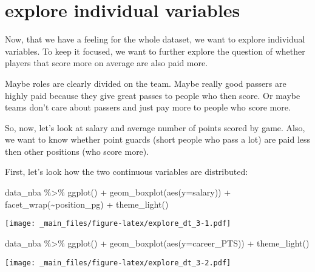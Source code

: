 \documentclass[
]{book}
\newenvironment{Shaded}{\begin{snugshade}}{\end{snugshade}}
\newcommand{\AttributeTok}[1]{\textcolor[rgb]{0.77,0.63,0.00}{#1}}
\newcommand{\AttributeTok}[1]{\textcolor[rgb]{0.13,0.29,0.53}{#1}}
\newcommand{\FunctionTok}[1]{\textcolor[rgb]{0.00,0.00,0.00}{#1}}
\newcommand{\FunctionTok}[1]{\textcolor[rgb]{0.13,0.29,0.53}{\textbf{#1}}}
\newcommand{\NormalTok}[1]{#1}
\newcommand{\SpecialCharTok}[1]{\textcolor[rgb]{0.00,0.00,0.00}{#1}}
\newcommand{\SpecialCharTok}[1]{\textcolor[rgb]{0.81,0.36,0.00}{\textbf{#1}}}
\begin{document}
\hypertarget{explore-individual-variables}{%
\section{explore individual variables}\label{explore-individual-variables}}

Now, that we have a feeling for the whole dataset, we want to explore individual
variables. To keep it focused, we want to further explore the question
of whether players that score more on average are also paid more.

Maybe roles are clearly divided on the team. Maybe really good passers are highly
paid because they give great passes to people who then score. Or maybe teams
don't care about passers and just pay more to people who score more.

So, now, let's look at salary and average number of points scored by game.
Also, we want to know whether point guards (short people who pass a lot) are
paid less then other positions (who score more).

First, let's look how the two continuous variables are distributed:

\begin{Shaded}
\begin{Highlighting}[]
\NormalTok{data\_nba }\SpecialCharTok{\%\textgreater{}\%} \FunctionTok{ggplot}\NormalTok{() }\SpecialCharTok{+} 
\FunctionTok{geom\_boxplot}\NormalTok{(}\FunctionTok{aes}\NormalTok{(}\AttributeTok{y=}\NormalTok{salary)) }\SpecialCharTok{+}
  \FunctionTok{facet\_wrap}\NormalTok{(}\SpecialCharTok{\textasciitilde{}}\NormalTok{position\_pg) }\SpecialCharTok{+}
  \FunctionTok{theme\_light}\NormalTok{()}
\end{Highlighting}
\end{Shaded}

\texttt{[image: \_main\_files/figure-latex/explore\_dt\_3-1.pdf]}

\begin{Shaded}
\begin{Highlighting}[]
\NormalTok{data\_nba }\SpecialCharTok{\%\textgreater{}\%} \FunctionTok{ggplot}\NormalTok{() }\SpecialCharTok{+} 
\FunctionTok{geom\_boxplot}\NormalTok{(}\FunctionTok{aes}\NormalTok{(}\AttributeTok{y=}\NormalTok{career\_PTS)) }\SpecialCharTok{+} 
  \FunctionTok{theme\_light}\NormalTok{()}
\end{Highlighting}
\end{Shaded}

\texttt{[image: \_main\_files/figure-latex/explore\_dt\_3-2.pdf]}
\end{document}
